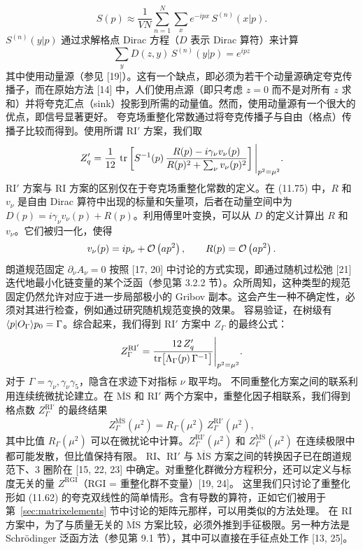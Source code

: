 \begin{equation}
S(p) \approx \frac{1}{VN}\sum_{n=1}^{N}\sum_x e^{-ipx}\, S^{(n)}(x|p) .
\end{equation}
$S^{(n)}(y|p)$ 通过求解格点 Dirac 方程（$D$ 表示 Dirac 算符）来计算
\begin{equation}
\sum_y D(z, y)\, S^{(n)}(y|p) = e^{ipz}
\end{equation}
其中使用动量源（参见 [19]）。这有一个缺点，即必须为若干个动量源确定夸克传播子，而在原始方法 [14] 中，人们使用点源（即只考虑 $z = 0$ 而不是对所有 $z$ 求和）并将夸克汇点（sink）投影到所需的动量值。然而，使用动量源有一个很大的优点，即信号显著更好。
夸克场重整化常数通过将夸克传播子与自由（格点）传播子比较而得到。使用所谓 RI$'$ 方案，我们取
\begin{equation}
Z_q' =
\frac{1}{12}\,
\operatorname{tr}\left[S^{-1}(p)\,
\frac{R(p) - i\gamma_\nu v_\nu(p)}
{R(p)^2 + \sum_\nu v_\nu(p)^2}\right]
\Bigg|_{p^2 = \mu^2} .
\end{equation}
RI$'$ 方案与 RI 方案的区别仅在于夸克场重整化常数的定义。在 (11.75) 中，$R$ 和 $v_\nu$ 是自由 Dirac 算符中出现的标量和矢量项，后者在动量空间中为 $D(p) = i\gamma_\nu v_\nu(p) + R(p)$。利用傅里叶变换，可以从 $D$ 的定义计算出 $R$ 和 $v_\nu$。它们被归一化，使得
\begin{equation}
v_\nu(p) = i p_\nu + \mathcal{O}\left(ap^2\right) , \qquad
R(p) = \mathcal{O}\left(ap^2\right) .
\end{equation}
朗道规范固定 $\partial_\nu A_\nu = 0$ 按照 [17, 20] 中讨论的方式实现，即通过随机过松弛 [21] 迭代地最小化链变量的某个泛函（参见第 3.2.2 节）。众所周知，这种类型的规范固定仍然允许对应于进一步局部极小的 Gribov 副本。这会产生一种不确定性，必须对其进行检查，例如通过研究随机规范变换的效果。
容易验证，在树级有 $\langle p|O_\Gamma\rangle{p}_0 = \Gamma$。综合起来，我们得到 RI$'$ 方案中 $Z_\Gamma$ 的最终公式：
\begin{equation}
Z_\Gamma^{\mathrm{RI}'} = \frac{12\,Z_q'}{\operatorname{tr}\bigl[\Lambda_\Gamma(p)\,\Gamma^{-1}\bigr]}
\Bigg|_{p^2 = \mu^2} .
\end{equation}
对于 $\Gamma = \gamma_\nu, \gamma_\nu\gamma_5$，隐含在求迹下对指标 $\nu$ 取平均。
不同重整化方案之间的联系利用连续统微扰论建立。在 $\overline{\mathrm{MS}}$ 和 RI$'$ 两个方案中，重整化因子相联系，我们得到格点数 $Z_\Gamma^{\mathrm{RI}'}$ 的最终结果
\begin{equation}
Z_\Gamma^{\overline{\mathrm{MS}}}(\mu^2) = R_\Gamma(\mu^2)\, Z_\Gamma^{\mathrm{RI}'}(\mu^2) ,
\end{equation}
其中比值 $R_\Gamma(\mu^2)$ 可以在微扰论中计算。$Z_\Gamma^{\mathrm{RI}'}(\mu^2)$ 和 $Z_\Gamma^{\overline{\mathrm{MS}}}(\mu^2)$ 在连续极限中都可能发散，但比值保持有限。
RI、RI$'$ 与 $\overline{\mathrm{MS}}$ 方案之间的转换因子已在朗道规范下、3 圈阶在 [15, 22, 23] 中确定。对重整化群微分方程积分，还可以定义与标度无关的量 $Z^{\mathrm{RGI}}$（RGI = 重整化群不变量）[19, 24]。
这里我们只讨论了重整化形如 (11.62) 的夸克双线性的简单情形。含有导数的算符，正如它们被用于第~\ref{sec:matrixelements} 节中讨论的矩阵元那样，可以用类似的方法处理。
在 RI 方案中，为了与质量无关的 $\overline{\mathrm{MS}}$ 方案比较，必须外推到手征极限。另一种方法是 Schrödinger 泛函方法（参见第 9.1 节），其中可以直接在手征点处工作 [13, 25]。

